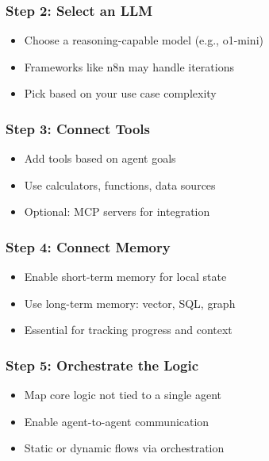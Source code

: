 \begin{frame}[fragile]\frametitle{Step 2: Select an LLM}
      \begin{itemize}
        \item Choose a reasoning-capable model (e.g., o1-mini)
        \item Frameworks like n8n may handle iterations
        \item Pick based on your use case complexity
      \end{itemize}
\end{frame}

\begin{frame}[fragile]\frametitle{Step 3: Connect Tools}
      \begin{itemize}
        \item Add tools based on agent goals
        \item Use calculators, functions, data sources
        \item Optional: MCP servers for integration
      \end{itemize}
\end{frame}

\begin{frame}[fragile]\frametitle{Step 4: Connect Memory}
      \begin{itemize}
        \item Enable short-term memory for local state
        \item Use long-term memory: vector, SQL, graph
        \item Essential for tracking progress and context
      \end{itemize}
\end{frame}

\begin{frame}[fragile]\frametitle{Step 5: Orchestrate the Logic}
      \begin{itemize}
        \item Map core logic not tied to a single agent
        \item Enable agent-to-agent communication
        \item Static or dynamic flows via orchestration
      \end{itemize}
\end{frame}

